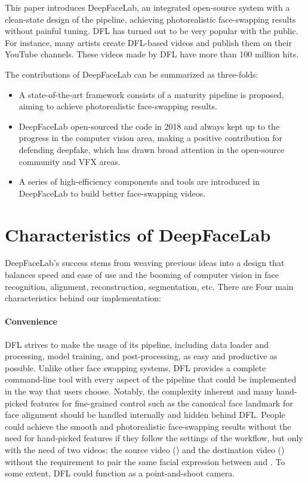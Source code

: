 \documentclass[10pt,twocolumn,letterpaper]{article}
\begin{document}
This paper introduces DeepFaceLab, an integrated open-source system with a clean-state design of the pipeline, achieving photorealistic face-swapping results without painful tuning. DFL has turned out to be very popular with the public. For instance, many artists create DFL-based videos and publish them on their YouTube channels. These videos made by DFL have more than 100 million hits.

The contributions of DeepFaceLab can be summarized as three-folds:

\begin{itemize}
	\item A state-of-the-art framework consists of a maturity pipeline is proposed, aiming to achieve photorealistic face-swapping results.
	
	\item DeepFaceLab open-sourced the code in 2018 and always kept up to the progress in the computer vision area, making a positive contribution for defending deepfake, which has drawn broad attention in the open-source community and VFX areas.
	
	\item A series of high-efficiency components and tools are introduced in DeepFaceLab to build better face-swapping videos.
\end{itemize}

\section{Characteristics of DeepFaceLab}

DeepFaceLab’s success stems from weaving previous ideas into a design that balances speed and ease of use and the booming of computer vision in face recognition, alignment, reconstruction, segmentation, etc. There are Four main characteristics behind our implementation:




\paragraph{Convenience}  DFL strives to make the usage of its pipeline, including data loader and processing, model training, and post-processing, as easy and productive as possible. Unlike other face swapping systems, DFL provides a complete command-line tool with every aspect of the pipeline that could be implemented in the way that users choose. Notably, the complexity inherent and many hand-picked features for fine-grained control such as the canonical face landmark for face alignment should be handled internally and hidden behind DFL. People could achieve the smooth and photorealistic face-swapping results without the need for hand-picked features if they follow the settings of the workflow, but only with the need of two videos: the source video () and the destination video () without the requirement to pair the same facial expression between  and . To some extent, DFL could function as a point-and-shoot camera. 
\end{document}
